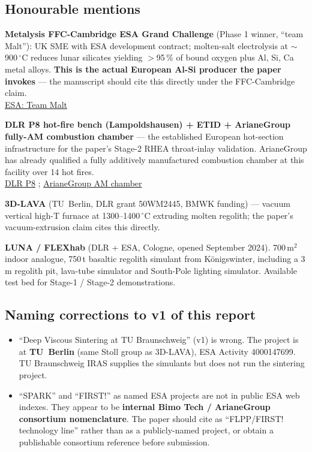 \documentclass[11pt,a4paper]{article}
\begin{document}
\subsection{Honourable mentions}

\textbf{Metalysis FFC-Cambridge ESA Grand Challenge} (Phase 1 winner,
``team Malt''): UK SME with ESA development contract; molten-salt
electrolysis at $\sim$900\,$^\circ$C reduces lunar silicates yielding
$>$95\,\% of bound oxygen plus Al, Si, Ca metal alloys. \textbf{This is the
actual European Al-Si producer the paper invokes} --- the manuscript should
cite this directly under the FFC-Cambridge claim.\\
\href{https://space-economy.esa.int/article/104/metalysisesa-grand-challenge-team-malt-wins-first-phase}{ESA: Team Malt}

\textbf{DLR P8 hot-fire bench (Lampoldshausen) + ETID + ArianeGroup
fully-AM combustion chamber} --- the established European hot-section
infrastructure for the paper's Stage-2 RHEA throat-inlay validation.
ArianeGroup has already qualified a fully additively manufactured
combustion chamber at this facility over 14 hot fires.\\
\href{https://www.dlr.de/en/research-and-transfer/research-infrastructure/p8-test-rig}{DLR P8} ;
\href{https://press.ariane.group/arianegroup-successfully-tests-combustion-chamber-produced-entirely-by-3d-printing-2-2}{ArianeGroup AM chamber}

\textbf{3D-LAVA} (TU~Berlin, DLR grant 50WM2445, BMWK funding) --- vacuum
vertical high-T furnace at 1300--1400\,$^\circ$C extruding molten regolith;
the paper's vacuum-extrusion claim cites this directly.

\textbf{LUNA / FLEXhab} (DLR + ESA, Cologne, opened September 2024).
700\,m$^2$ indoor analogue, 750\,t basaltic regolith simulant from
K\"onigswinter, including a 3\,m regolith pit, lava-tube simulator and
South-Pole lighting simulator. Available test bed for Stage-1 / Stage-2
demonstrations.

\subsection{Naming corrections to v1 of this report}

\begin{caveatbox}[title=Two factual errors fixed]
\begin{itemize}
  \item ``Deep Viscous Sintering at TU Braunschweig'' (v1) is wrong. The
        project is at \textbf{TU~Berlin} (same Stoll group as 3D-LAVA), ESA
        Activity 4000147699. TU Braunschweig IRAS supplies the simulants
        but does not run the sintering project.
  \item ``SPARK'' and ``FIRST!'' as named ESA projects are not in public
        ESA web indexes. They appear to be \textbf{internal Bimo Tech /
        ArianeGroup consortium nomenclature}. The paper should cite as
        ``FLPP/FIRST! technology line'' rather than as a publicly-named
        project, or obtain a publishable consortium reference before
        submission.
\end{itemize}
\end{caveatbox}
\end{document}
